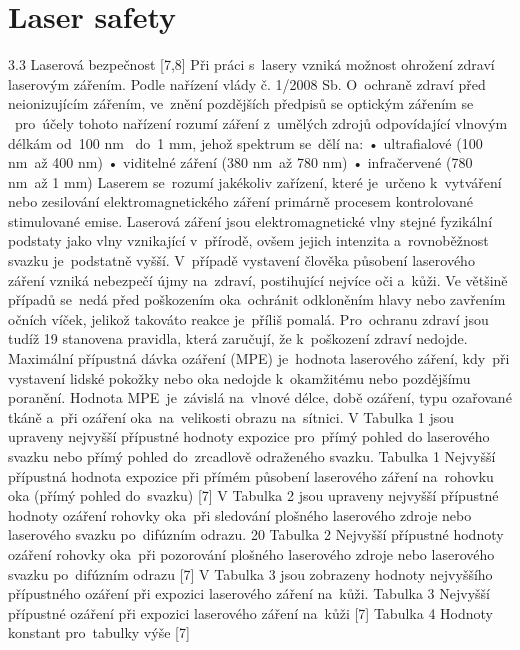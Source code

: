 \chapter{Laser safety}

3.3 Laserová bezpečnost [7,8]
Při práci s~lasery vzniká možnost ohrožení zdraví laserovým zářením. Podle nařízení vlády
č. 1/2008 Sb. O~ochraně zdraví před neionizujícím zářením, ve~znění pozdějších předpisů se
optickým zářením se ~pro~účely tohoto nařízení rozumí záření z~umělých zdrojů odpovídající
vlnovým délkám od~100 nm ~do~1 mm, jehož spektrum se~dělí na:
• ultrafialové (100 nm~až 400 nm)
• viditelné záření (380 nm~až 780 nm)
• infračervené (780 nm~až 1 mm)
Laserem se~rozumí jakékoliv zařízení, které je~určeno k~vytváření nebo zesilování
elektromagnetického záření primárně procesem kontrolované stimulované emise. Laserová
záření jsou elektromagnetické vlny stejné fyzikální podstaty jako vlny vznikající v~přírodě,
ovšem jejich intenzita a~rovnoběžnost svazku je~podstatně vyšší. V~případě vystavení člověka
působení laserového záření vzniká nebezpečí újmy na~zdraví, postihující nejvíce oči a~kůži.
Ve většině případů se~nedá před poškozením oka~ochránit odkloněním hlavy nebo
zavřením očních víček, jelikož takováto reakce je~příliš pomalá. Pro~ochranu zdraví jsou tudíž
19
stanovena pravidla, která zaručují, že k~poškození zdraví nedojde. Maximální přípustná dávka
ozáření (MPE) je~hodnota laserového záření, kdy~při vystavení lidské pokožky nebo oka
nedojde k~okamžitému nebo pozdějšímu poranění. Hodnota MPE~je~závislá na~vlnové délce,
době ozáření, typu ozařované tkáně a~při ozáření oka~na~velikosti obrazu na~sítnici.
V Tabulka 1 jsou upraveny nejvyšší přípustné hodnoty expozice pro~přímý pohled do
laserového svazku nebo přímý pohled do~zrcadlově odraženého svazku.
Tabulka 1 Nejvyšší přípustná hodnota expozice při přímém působení laserového záření na~rohovku oka
(přímý pohled do~svazku) [7]
V Tabulka 2 jsou upraveny nejvyšší přípustné hodnoty ozáření rohovky oka~při sledování
plošného laserového zdroje nebo laserového svazku po~difúzním odrazu.
20
Tabulka 2 Nejvyšší přípustné hodnoty ozáření rohovky oka~při pozorování plošného laserového zdroje
nebo laserového svazku po~difúzním odrazu [7]
V Tabulka 3 jsou zobrazeny hodnoty nejvyššího přípustného ozáření při expozici
laserového záření na~kůži.
Tabulka 3 Nejvyšší přípustné ozáření při expozici laserového záření na~kůži [7]
Tabulka 4 Hodnoty konstant pro~tabulky výše [7]

